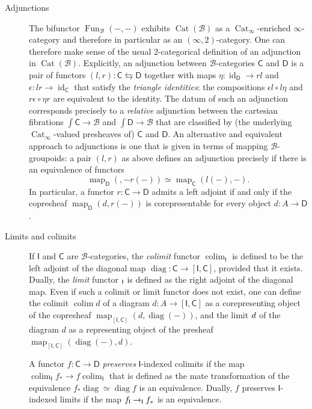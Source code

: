 \documentclass[reqno]{amsart}
\numberwithin{equation}{subsection}
\theoremstyle{plain}
\theoremstyle{definition}
\let\scr=\mathcal
\def\BB{\scr B}
\DeclareMathOperator{\id}{id}
\DeclareMathOperator{\Cat}{Cat}
\DeclareMathOperator{\Fun}{Fun}
\DeclareMathOperator{\Map}{map}
\DeclareMathOperator{\diag}{diag}
\newcommand{\map}[1]{\Map_{#1}}
\newcommand{\I}[1]{\mathsf{#1}}
\newcommand{\iFun}[2]{{[#1,#2]}}
\newcommand{\CatS}{\Cat_{\infty}}
\let\lim=\relax
\DeclareMathOperator*{\lim}{lim}
\DeclareMathOperator*{\colim}{colim}
\begin{document}
\begin{description}
    \item[Adjunctions]
    The bifunctor $\Fun_{\BB}(-,-)$ exhibits $\Cat(\BB)$ as a $\CatS$-enriched $\infty$-category and therefore in particular as an $(\infty,2)$-category. One can therefore make sense of the usual $2$-categorical definition of an adjunction in $\Cat(\BB)$. Explicitly, an adjunction between $\BB$-categories $\I{C}$ and $\I{D}$ is a pair of functors $(l,r)\colon \I{C}\leftrightarrows\I{D}$ together with maps $\eta\colon\id_{\I{D}}\to rl$ and $\epsilon\colon lr\to\id_{\I{C}}$ that satisfy the \emph{triangle identities}: the compositions $\epsilon l\circ l\eta$ and $r\epsilon\circ\eta r$ are equivalent to the identity. The datum of such an adjunction corresponds precisely to a \emph{relative} adjunction between the cartesian fibrations $\int \I{C}\to\BB$ and $\int\I{D}\to \BB$ that are classified by (the underlying $\CatS$-valued presheaves of) $\I{C}$ and $\I{D}$. An alternative and equivalent approach to adjunctions is one that is given in terms of mapping $\BB$-groupoids: a pair $(l,r)$ as above defines an adjunction precisely if there is an equivalence of functors
    \begin{equation*}
    \map{\I{D}}(,-r(-))\simeq\map{\I{C}}(l(-),-).
    \end{equation*}
    In particular, a functor $r\colon\I{C}\to\I{D}$ admits a left adjoint if and only if the copresheaf $\map{\I{D}}(d,r(-))$ is corepresentable for every object $d\colon A\to\I{D}$.
    
    \item[Limits and colimits]
    If $\I{I}$ and $\I{C}$ are $\BB$-categories, the \emph{colimit} functor $\colim_{\I{I}}$ is defined to be the left adjoint of the diagonal map $\diag\colon\I{C}\to\iFun{\I{I}}{\I{C}}$, provided that it exists. Dually, the \emph{limit} functor $\lim_{\I{I}}$ is defined as the right adjoint of the diagonal map. Even if such a colimit or limit functor does not exist, one can define the colimit $\colim d$ of a diagram $d\colon A\to\iFun{\I{I}}{\I{C}}$ as a corepresenting object of the copresheaf $\map{\iFun{\I{I}}{\I{C}}}(d,\diag(-))$, and the limit $\lim d$ of the diagram $d$ as a representing object of the presheaf $\map{\iFun{\I{I}}{\I{C}}}(\diag(-), d)$.
    
    A functor $f\colon\I{C}\to\I{D}$ \emph{preserves} $\I{I}$-indexed colimits if the map $\colim_{\I{I}} f_\ast\to f\colim_{\I{I}}$ that is defined as the mate transformation of the equivalence $f_\ast \diag\simeq\diag f$ is an equivalence. Dually, $f$ preserves $\I{I}$-indexed limits if the map $f\lim_{\I{I}}\to\lim_{\I{I}}f_\ast$ is an equivalence.
    

\end{description}
\end{document}
